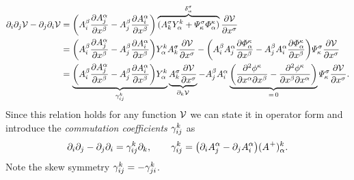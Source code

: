 \begin{align}\label{eq:DerivationCommCoeff2}
 \dirDiff{\LidxI} \dirDiff{\LidxII} \potentialEnergy - \dirDiff{\LidxII} \dirDiff{\LidxI} \potentialEnergy 
 &= \bigg(\kinMatCoeff{\GidxII}{\LidxI} \pdiff[\kinMatCoeff{\GidxI}{\LidxII}]{\sysCoordCoeff{\GidxII}} - \kinMatCoeff{\GidxII}{\LidxII} \pdiff[\kinMatCoeff{\GidxI}{\LidxI}]{\sysCoordCoeff{\GidxII}}\bigg) \overbrace{(\kinMatCoeff{\GidxIII}{\LidxIII} \kinBasisMatCoeff{\LidxIII}{\GidxI} + \InvGeoConstraintMatCoeff{\GidxIII}{\CidxI}\geoConstraintMatCoeff{\CidxI}{\GidxI})}^{\delta^{\GidxIII}_{\GidxI}}  \pdiff[\potentialEnergy]{\sysCoordCoeff{\GidxIII}}
\nonumber\\
 &= \bigg(\kinMatCoeff{\GidxII}{\LidxI} \pdiff[\kinMatCoeff{\GidxI}{\LidxII}]{\sysCoordCoeff{\GidxII}} - \kinMatCoeff{\GidxII}{\LidxII} \pdiff[\kinMatCoeff{\GidxI}{\LidxI}]{\sysCoordCoeff{\GidxII}}\bigg) \kinBasisMatCoeff{\LidxIII}{\GidxI} \kinMatCoeff{\GidxIII}{\LidxIII} \pdiff[\potentialEnergy]{\sysCoordCoeff{\GidxIII}}
 - \bigg(\kinMatCoeff{\GidxII}{\LidxI} \kinMatCoeff{\GidxI}{\LidxII} \pdiff[\geoConstraintMatCoeff{\CidxI}{\GidxI}]{\sysCoordCoeff{\GidxII}} - \kinMatCoeff{\GidxII}{\LidxII} \kinMatCoeff{\GidxI}{\LidxI} \pdiff[\geoConstraintMatCoeff{\CidxI}{\GidxI}]{\sysCoordCoeff{\GidxII}} \bigg) \InvGeoConstraintMatCoeff{\GidxIII}{\CidxI} \pdiff[\potentialEnergy]{\sysCoordCoeff{\GidxIII}}
\nonumber\\
 &= \underbrace{\bigg(\kinMatCoeff{\GidxII}{\LidxI} \pdiff[\kinMatCoeff{\GidxI}{\LidxII}]{\sysCoordCoeff{\GidxII}} - \kinMatCoeff{\GidxII}{\LidxII} \pdiff[\kinMatCoeff{\GidxI}{\LidxI}]{\sysCoordCoeff{\GidxII}}\bigg) \kinBasisMatCoeff{\LidxIII}{\GidxI}}_{\BoltzSym{\LidxIII}{\LidxI}{\LidxII}} \underbrace{\kinMatCoeff{\GidxIII}{\LidxIII} \pdiff[\potentialEnergy]{\sysCoordCoeff{\GidxIII}}}_{\dirDiff{\LidxIII} \potentialEnergy}
 - \kinMatCoeff{\GidxII}{\LidxII} \kinMatCoeff{\GidxI}{\LidxI} \underbrace{\bigg(\frac{\partial^2\geoConstraintCoeff{\CidxI}}{\partial\sysCoordCoeff{\GidxI}\partial\sysCoordCoeff{\GidxII}} - \frac{\partial^2\geoConstraintCoeff{\CidxI}}{\partial\sysCoordCoeff{\GidxII}\partial\sysCoordCoeff{\GidxI}} \bigg)}_{=\,0} \InvGeoConstraintMatCoeff{\GidxIII}{\CidxI} \pdiff[\potentialEnergy]{\sysCoordCoeff{\GidxIII}}
 .
\end{align}
Since this relation holds for any function $\potentialEnergy$ we can state it in operator form and introduce the \textit{commutation coefficients} $\BoltzSym{\LidxIII}{\LidxI}{\LidxII}$ as
\begin{align}\label{eq:DefCommutationCoeff}
 \dirDiff{\LidxI} \dirDiff{\LidxII} - \dirDiff{\LidxII} \dirDiff{\LidxI} = \BoltzSym{\LidxIII}{\LidxI}{\LidxII} \dirDiff{\LidxIII},
\qquad
 \BoltzSym{\LidxIII}{\LidxI}{\LidxII} = \big(\dirDiff{\LidxI} \kinMatCoeff{\GidxI}{\LidxII} - \dirDiff{\LidxII} \kinMatCoeff{\GidxI}{\LidxI} \big) ({\kinMatCoeff{}{}}^+)^{\LidxIII}_{\GidxI}.
\end{align}
Note the skew symmetry $\BoltzSym{\LidxIII}{\LidxI}{\LidxII} = -\BoltzSym{\LidxIII}{\LidxII}{\LidxI}$.

